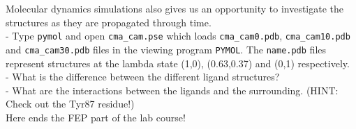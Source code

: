 \documentclass[a4paper,12pt]{article}
\newcommand{\pymol}{\texttt{PYMOL}}
\begin{document}
Molecular dynamics simulations also gives us an opportunity to
investigate the structures as they are propagated through time. \\

- Type \texttt{pymol} and open \texttt{cma\_cam.pse} which loads
\texttt{cma\_cam0.pdb}, \texttt{cma\_cam10.pdb} and
\texttt{cma\_cam30.pdb} files in the viewing program \pymol. The
\texttt{name.pdb} files represent structures at the lambda state
(1,0), (0.63,0.37) and (0,1) respectively. \\

- What is the difference between the different ligand structures?\\

- What are the interactions between the ligands and the
surrounding. (HINT: Check out the Tyr87 residue!)\\

Here ends the FEP part of the lab course!


\newpage
\appendix
\end{document}
